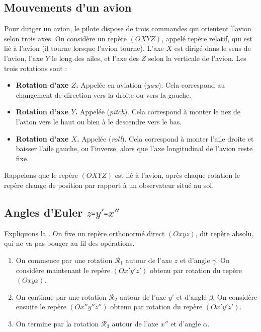 \documentclass[11pt,class=report,crop=false]{standalone}
\begin{document}
\subsection{Mouvements d'un avion}

Pour diriger un avion, le pilote dispose de trois commandes qui orientent l'avion selon trois axes.
On considère un repère $(OXYZ)$, appelé repère relatif, qui est lié à l'avion (il tourne lorsque l'avion tourne). L'axe $X$ est dirigé dans le sens de l'avion, l'axe $Y$ le long des ailes, et l'axe des $Z$ selon la verticale de l'avion.
Les trois rotations sont :
\begin{itemize}
  \item \textbf{Rotation d'axe $Z$.} Appelée  en aviation (\emph{yaw}). Cela correspond au changement de direction vers la droite ou vers la gauche.

  \item \textbf{Rotation d'axe $Y$.} Appelée  (\emph{pitch}). Cela correspond à monter le nez de l'avion vers le haut ou bien à le descendre vers le bas.

  \item \textbf{Rotation d'axe $X$.} Appelée  (\emph{roll}). Cela correspond   
  à monter l'aile droite et baisser l'aile gauche, ou l'inverse, alors que l'axe longitudinal de l'avion reste fixe.
\end{itemize}

Rappelons que le repère $(OXYZ)$ est lié à l'avion, après chaque rotation le repère change de position par rapport à un observateur situé au sol.



\subsection{Angles d'Euler $z$-$y'$-$x''$}

Expliquons la .
On fixe un repère orthonormé direct $(Oxyz)$, dit repère absolu, qui ne va pas bouger au fil des opérations.

\begin{enumerate}
  \item On commence par une rotation $\mathcal{R}_1$ autour de l'axe $z$ et d'angle $\gamma$. On considère maintenant le repère $(Ox'y'z')$ obtenu par rotation du repère $(Oxyz)$.
 
  \item On continue par une rotation $\mathcal{R}_2$ autour de l'axe $y'$ et d'angle $\beta$.
  On considère ensuite le repère $(Ox''y''z'')$ obtenu par rotation du repère $(Ox'y'z')$.

  \item On termine par la rotation $\mathcal{R}_3$ autour de l'axe $x''$ et d'angle $\alpha$.
\end{enumerate}
\end{document}

